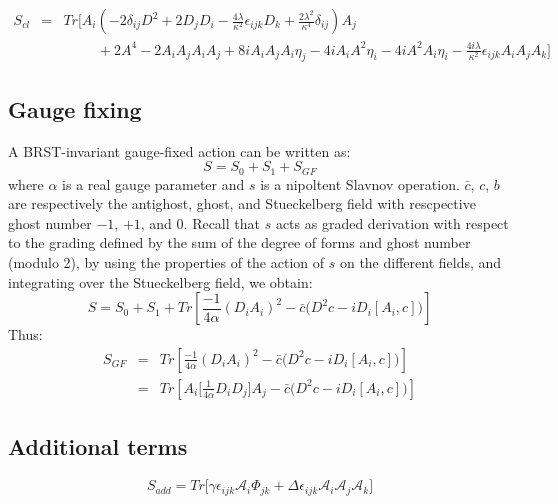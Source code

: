 \documentclass[a4paper,11pt]{article} %
\numberwithin{equation}{section} %
\numberwithin{figure}{section} %
\theoremstyle{plain} %
\theoremstyle{definition} %
\theoremstyle{remark} %
\begin{document}
\begin{eqnarray*}
 S_{cl} &=& Tr \Big[ A_i \left( - 2 \delta_{ij} D^2 + 2 D_j D_i - \frac{4\lambda}{\kappa^2} \epsilon_{ijk}  D_k + \frac{2\lambda^2}{\kappa^4} \delta_{ij} \right) A_j \\
     && \hspace{1cm} + 2 A^4 -2 A_i A_j A_i A_j + 8i A_i A_j A_i \eta_j - 4i A_i A^2 \eta_i - 4i A^2 A_i \eta_i - \frac{4i\lambda}{\kappa^2} \epsilon_{ijk} A_i A_j A_k  \Big]
\end{eqnarray*}

\subsection*{Gauge fixing} 

\noindent
A BRST-invariant gauge-fixed action can be written as:
\begin{equation*}
 S = S_0 + S_1 + S_{GF} 
\end{equation*}
where $\alpha$ is a real gauge parameter and $s$ is a nipoltent Slavnov operation. $\bar{c}$, $c$, $b$ are respectively the antighost, ghost, and Stueckelberg field with rescpective ghost number $-1$, $+1$, and $0$. Recall that $s$ acts as graded derivation with respect to the grading defined by the sum of the degree of forms and ghost number (modulo 2), by using the properties of the action of $s$ on the different fields, and integrating over the Stueckelberg field, we obtain:
\begin{equation*}
 S = S_0 + S_1 + Tr \left[ \frac{-1}{4 \alpha} (D_i A_i)^2 - \bar{c} \big( D^2 c - i D_i [A_i , c] \big) \right]
\end{equation*}
Thus:
\begin{eqnarray*}
 S_{GF} &=& Tr \left[ \frac{-1}{4 \alpha} (D_i A_i)^2 - \bar{c} \big( D^2 c - i D_i [A_i , c] \big) \right] \\
        &=& Tr \left[ A_i \big[ \frac{1}{4 \alpha} D_i D_j \big] A_j - \bar{c} \big( D^2 c - i D_i [A_i , c] \big) \right]
\end{eqnarray*}

\subsection*{Additional terms}

\begin{equation*}
 S_{add} = Tr \Bigg[ \gamma \epsilon_{ijk} \mathcal{A}_i \Phi_{jk} + \Delta \epsilon_{ijk} \mathcal{A}_{i} \mathcal{A}_{j} \mathcal{A}_{k} \Bigg]
\end{equation*}
\end{document}
